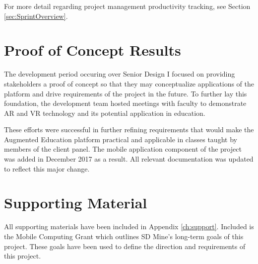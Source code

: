 For more detail regarding project management productivity tracking, see Section \ref{sec:SprintOverview}.

\section{Proof of Concept Results}


The development period occuring over Senior Design I focused on providing stakeholders a proof of concept so that they may conceptualize applications of the platform and drive requirements of the project in the future. To further lay this foundation, the development team hosted meetings with faculty to demonstrate AR and VR technology and its potential application in education. 

These efforts were successful in further refining requirements that would make the Augmented Education platform practical and applicable in classes taught by members of the client panel. The mobile application component of the project was added in December 2017 as a result. All relevant documentation was updated to reflect this major change. 

\section{Supporting Material}

All supporting materials have been included in Appendix \ref{ch:support}. Included is the Mobile Computing Grant which outlines SD Mine's long-term goals of this project. These goals have been used to define the direction and requirements of this project.
